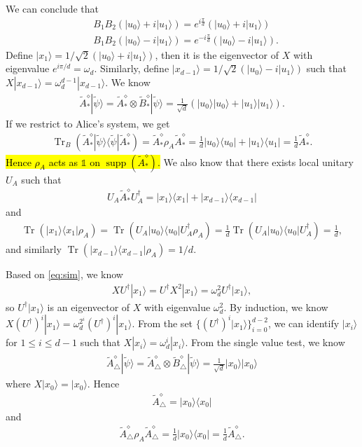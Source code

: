 \documentclass[11pt,letterpaper]{article}
\newcommand{\ket}[1]{|#1\rangle}
\newcommand{\ketbra}[2]{|#1\rangle\langle#2|}
\newcommand{\x}{\otimes}
\DeclareMathOperator{\Tr}{Tr}
\DeclareMathOperator{\supp}{supp}
\newcommand{\1}{\mathbb{1}}
\newcommand{\tA}{\tilde{A}}
\newcommand{\tB}{\tilde{B}}
\newcommand{\tpsi}{\tilde{\psi}}
\theoremstyle{definition}
\begin{document}
We can conclude that 
\begin{align}
	&B_1B_2(\ket{u_0} + i\ket{u_1}) = e^{i \frac{\pi}{d}} (\ket{u_0} + i\ket{u_1})\\
	&B_1B_2(\ket{u_0} - i\ket{u_1}) = e^{-i \frac{\pi}{d}} (\ket{u_0} - i\ket{u_1}).
\end{align}
Define $\ket{x_1} = 1/\sqrt{2}(\ket{u_0} + i\ket{u_1})$, then it is the eigenvector of $X$ with eigenvalue $e^{i\pi/d} = \omega_d$.
Similarly, define $\ket{x_{d-1}} = 1/\sqrt{2}(\ket{u_0} - i\ket{u_1})$ such that $X \ket{x_{d-1}} = \omega_d^{d-1}\ket{x_{d-1}}$.
We know 
\begin{align}
	\tA_\ast^\diamond \ket{\tpsi} = \tA_\ast^\diamond \x \tB_\ast^\diamond \ket{\tpsi} = \frac{1}{\sqrt{d}} (\ket{u_0}\ket{u_0} + \ket{u_1}\ket{u_1}).
\end{align}
If we restrict to Alice's system, we get 
\begin{align}
	\Tr_B(\tA_\ast^\diamond \ketbra{\tpsi}{\tpsi} \tA_\ast^\diamond) =\tA_\ast^\diamond \rho_A \tA_\ast^\diamond = 
 \frac{1}{d} \ketbra{u_0}{u_0} + \ketbra{u_1}{u_1} = \frac{1}{d} \tA_\ast^\diamond.
\end{align}
\hl{Hence $\rho_A$ acts as $\1$ on $\supp(\tA_\ast^\diamond)$.}
We also know that there exists local unitary $U_A$ such that 
\begin{align}
U_A \tA_\ast^\diamond U_A^\dagger = \ketbra{x_1}{x_1}+\ketbra{x_{d-1}}{x_{d-1}}
\end{align}
and 
\begin{align}
\Tr(\ketbra{x_1}{x_1} \rho_A)
=\Tr(U_A \ketbra{u_0}{u_0} U_A^\dagger \rho_A) 
= \frac{1}{d} \Tr(U_A\ketbra{u_0}{u_0} U_A^\dagger) 
= \frac{1}{d},
\end{align}
and similarly $\Tr( \ketbra{x_{d-1}}{x_{d-1}}\rho_A) = 1/d$.

Based on \cref{eq:sim}, we know
\begin{align}
\label{eq:ladder}
 XU^\dagger \ket{x_1} = U^\dagger X^2 \ket{x_1} = \omega_d^2 U^\dagger \ket{x_1},
\end{align}
so $U^\dagger \ket{x_1}$ is an eigenvector of $X$ with eigenvalue $\omega_d^2$.
By induction, we know $X (U^\dagger)^i \ket{x_1} = \omega_d^{2^i} (U^\dagger)^i\ket{x_1}$. 
From the set $\{(U^\dagger)^i \ket{x_1}\}_{i=0}^{d-2}$, we can identify $\ket{x_i}$ for $1 \leq i \leq d-1$
such that $X \ket{x_i} = \omega_d^i \ket{x_i}$.
From the single value test, we know 
\begin{align}
	\tA_\triangle^\diamond \ket{\tpsi} = \tA_\triangle^\diamond \x \tB_\triangle^\diamond \ket{\tpsi} = \frac{1}{\sqrt{d}}
	\ket{x_0}\ket{x_0}
\end{align}
where $X \ket{x_0} = \ket{x_0}$. Hence 
\begin{align}
	\tA_\triangle^\diamond  = \ketbra{x_0}{x_0}
\end{align}
and 
\begin{align}
	\tA_\triangle^\diamond \rho_A \tA_\triangle^\diamond = \frac{1}{d} \ketbra{x_0}{x_0} = \frac{1}{d} \tA_\triangle^\diamond.
\end{align}
\end{document}
